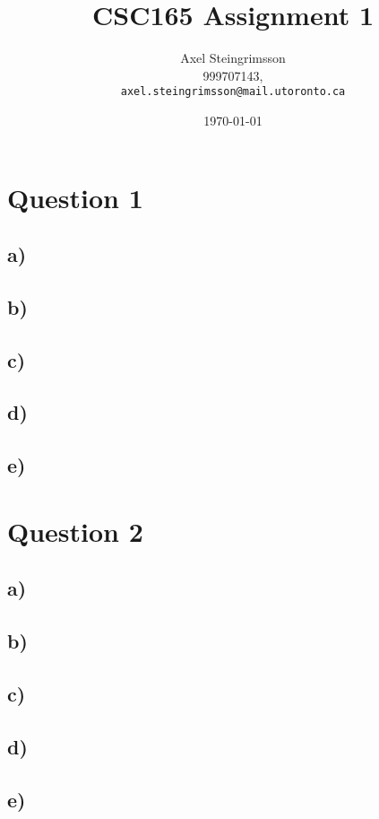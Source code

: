 \documentclass{article}
\begin{document}
\title{CSC165 Assignment 1}
\author{Axel Steingrimsson\\
  999707143,\\
  \texttt{axel.steingrimsson@mail.utoronto.ca}}
\date{\today}
\maketitle

\section{Question 1}
\subsection{a)}

\subsection{b)}
\subsection{c)}
\subsection{d)}
\subsection{e)}

\section{Question 2}
\subsection{a)}
\subsection{b)}
\subsection{c)}
\subsection{d)}
\subsection{e)}
\end{document}
